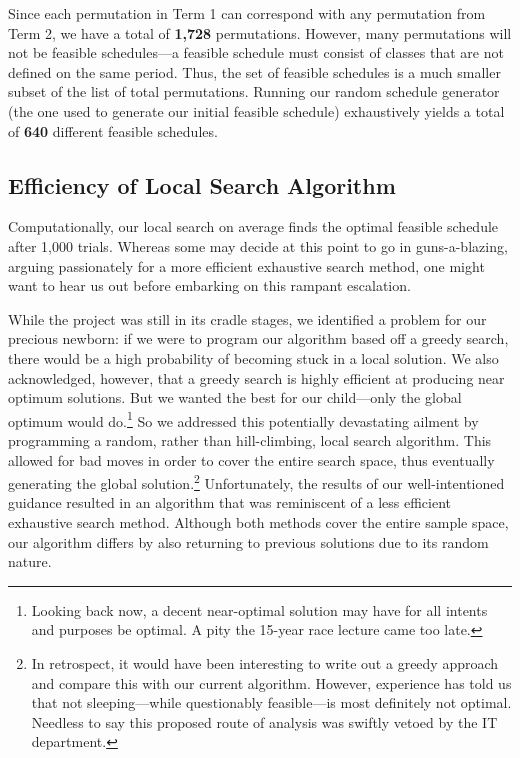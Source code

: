 \documentclass[11pt, oneside]{article}   	%
\begin{document}
Since each permutation in Term 1 can correspond with any permutation from Term 2, we have a total of \textbf{1,728} permutations. However, many permutations will not be feasible schedules---a feasible schedule must consist of classes that are not defined on the same period. Thus, the set of feasible schedules is a much smaller subset of the list of total permutations. Running our random schedule generator (the one used to generate our initial feasible schedule) exhaustively yields a total of \textbf{640} different feasible schedules. 

\subsection{Efficiency of Local Search Algorithm}

Computationally, our local search on average finds the optimal feasible schedule after 1,000 trials.  Whereas some may decide at this point to go in guns-a-blazing, arguing passionately for a more efficient exhaustive search method, one might want to hear us out before embarking on this rampant escalation. 

While the project was still in its cradle stages, we identified a problem for our precious newborn: if we were to program our algorithm based off a greedy search, there would be a high probability of becoming stuck in a local solution. We also acknowledged, however, that a greedy search is highly efficient at producing near optimum solutions. But we wanted the best for our child---only the global optimum would do.\footnote{Looking back now, a decent near-optimal solution may have for all intents and purposes be optimal. A pity the 15-year race lecture came too late.} So we addressed this potentially devastating ailment by programming a random, rather than hill-climbing, local search algorithm. This allowed for bad moves in order to cover the entire search space, thus eventually generating the global solution.\footnote{In retrospect, it would have been interesting to write out a greedy approach and compare this with our current algorithm. However, experience has told us that not sleeping---while questionably feasible---is most definitely not optimal. Needless to say this proposed route of analysis was swiftly vetoed by the IT department.} Unfortunately, the results of our well-intentioned guidance resulted in an algorithm that was reminiscent of a less efficient exhaustive search method. Although both methods cover the entire sample space, our algorithm differs by also returning to previous solutions due to its random nature. 
\end{document}

